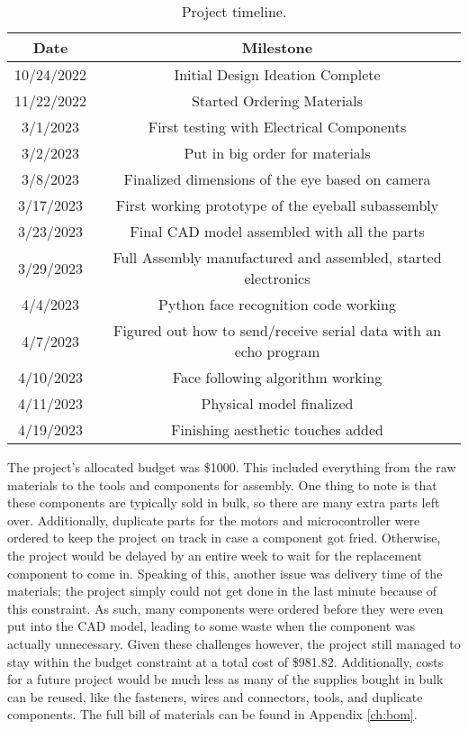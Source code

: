 \begin{table}[h]
    \centering
    \begin{tabular}{|c|c|}
        \hline
        Date & Milestone\\
        \hline
        \hline
        10/24/2022 & Initial Design Ideation Complete \\
        \hline
11/22/2022&Started Ordering Materials\\
\hline
3/1/2023&First testing with Electrical Components\\
\hline
3/2/2023&Put in big order for materials\\\hline
3/8/2023&Finalized dimensions of the eye based on camera\\\hline
3/17/2023&First working prototype of the eyeball subassembly\\\hline
3/23/2023&Final CAD model assembled with all the parts\\\hline
3/29/2023&Full Assembly manufactured and assembled, started electronics\\\hline
4/4/2023&Python face recognition code working\\\hline
4/7/2023&Figured out how to send/receive serial data with an echo program\\\hline
4/10/2023&Face following algorithm working\\\hline
4/11/2023&Physical model finalized\\\hline
4/19/2023&Finishing aesthetic touches added\\\hline


    \end{tabular}
    \caption{Project timeline.}
    \label{tab:timeline}
\end{table}

The project's allocated budget was \$1000. This included everything from the raw materials to the tools and components for assembly. One thing to note is that these components are typically sold in bulk, so there are many extra parts left over. Additionally, duplicate parts for the motors and microcontroller were ordered to keep the project on track in case a component got fried. Otherwise, the project would be delayed by an entire week to wait for the replacement component to come in. Speaking of this, another issue was delivery time of the materials; the project simply could not get done in the last minute because of this constraint. As such, many components were ordered before they were even put into the CAD model, leading to some waste when the component was actually unnecessary. Given these challenges however, the project still managed to stay within the budget constraint at a total cost of \$981.82. Additionally, costs for a future project would be much less as many of the supplies bought in bulk can be reused, like the fasteners, wires and connectors, tools, and duplicate components. The full bill of materials can be found in Appendix \ref{ch:bom}.

